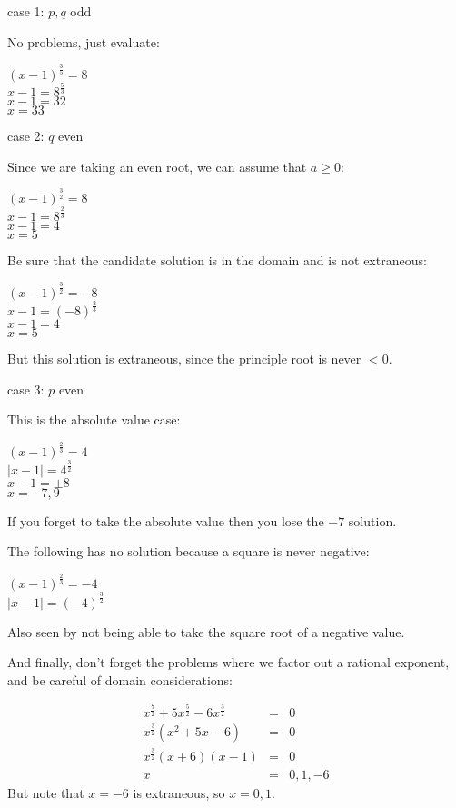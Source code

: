 \documentclass[letterpaper,12pt,fleqn]{article}
\begin{document}
\begin{description}
\item case 1: $p,q$ odd

  No problems, just evaluate:

  $(x-1)^{\frac{3}{5}}=8$ \\
  $x-1=8^{\frac{5}{3}}$ \\
  $x-1=32$ \\
  $x=33$

\item case 2: $q$ even

  Since we are taking an even root, we can assume that $a\ge0$:

  $(x-1)^{\frac{3}{2}}=8$ \\
  $x-1=8^{\frac{2}{3}}$ \\
  $x-1=4$ \\
  $x=5$

  Be sure that the candidate solution is in the domain and is not extraneous:

  $(x-1)^{\frac{3}{2}}=-8$ \\
  $x-1=(-8)^{\frac{2}{3}}$ \\
  $x-1=4$ \\
  $x=5$

  But this solution is extraneous, since the principle root is never $<0$.

\item case 3: $p$ even

  This is the absolute value case:

  $(x-1)^{\frac{2}{3}}=4$ \\
  $|x-1|=4^{\frac{3}{2}}$ \\
  $x-1=\pm8$ \\
  $x=-7,9$

  If you forget to take the absolute value then you lose the $-7$ solution.

  The following has no solution because a square is never negative:

  $(x-1)^{\frac{2}{3}}=-4$ \\
  $|x-1|=(-4)^{\frac{3}{2}}$

  Also seen by not being able to take the square root of a negative value.
  
\end{description}

And finally, don't forget the problems where we factor out a rational exponent,
and be careful of domain considerations:

\begin{eqnarray*}
  x^{\frac{7}{2}}+5x^{\frac{5}{2}}-6x^{\frac{3}{2}} &=& 0 \\
  x^{\frac{3}{2}}(x^2+5x-6) &=& 0 \\
  x^{\frac{3}{2}}(x+6)(x-1) &=& 0 \\
  x &=& 0,1,-6
\end{eqnarray*}
But note that $x=-6$ is extraneous, so $x=0,1$.
\end{document}
